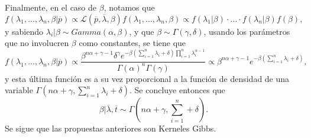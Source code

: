 \documentclass[letterpaper]{article}
\newcommand{\1}{\mathds{1}}
\theoremstyle{definition}
\theoremstyle{definition}
\theoremstyle{definition}
\theoremstyle{definition}
\theoremstyle{definition}
\begin{document}
\begin{itemize}
    Finalmente, en el caso de $\beta$, notamos que  
    \[
        f(\lambda_1,...,\lambda_n,\beta|\overline{p})\propto\mathcal{L}(\overline{p},\overline{\lambda},\beta)f(\lambda_1,...,\lambda_n,\beta)\propto f(\lambda_1|\beta)\cdot...\cdot f(\lambda_n|\beta)f(\beta), 
    \]
    y sabiendo $\lambda_i|\beta \sim Gamma(\alpha,\beta)$, y que $\beta\sim\Gamma(\gamma,\delta)$, usando los parámetros que no involucren $\beta$ como constantes, 
    se tiene que 
    \[
        f(\lambda_1,...,\lambda_n,\beta|\overline{p})\propto\frac{\beta^{n\alpha+\gamma-1} \delta^{\gamma}e^{-\beta(\sum_{i=1}^{n}\lambda_i+\delta)\prod_{i=1}^{n}\lambda_i^{\alpha-1}}}{\Gamma(\alpha)^{n}\Gamma(\gamma)}\propto \beta^{n\alpha+\gamma-1}e^{-\beta(\sum_{i=1}^{n}\lambda_i+\delta)},
    \]
    y esta última función es a su vez proporcional a la función de densidad de una variable $\Gamma(n\alpha+\gamma,\sum_{i=1}^{n}\lambda_i +\delta)$.
    Se concluye entonces que 
    \[
        \beta|\overline{\lambda},\overline{t}\sim \Gamma(n\alpha+\gamma,\sum_{i=1}^{n}+\delta).
    \]
    Se sigue que las propuestas anteriores son Kerneles Gibbs.
\end{itemize}
\end{document}
